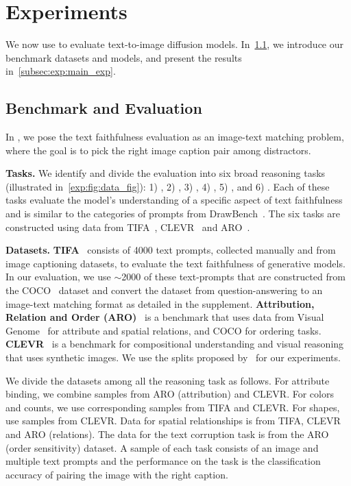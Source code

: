 \section{Experiments}
\label{sec:experiments}

We now use \OURS to evaluate text-to-image diffusion models.
In~\cref{subsec:exp:benchmark}, we introduce our benchmark datasets and models, and present the \OURS results in~\cref{subsec:exp:main_exp}.

\subsection{Benchmark and Evaluation}\label{subsec:exp:benchmark}
In \OURS, we pose the text faithfulness evaluation as an image-text matching problem, where the goal is to pick the right image caption pair among distractors.
\par \noindent \textbf{Tasks.}
We identify and divide the evaluation into six broad reasoning tasks (illustrated in~\cref{exp:fig:data_fig}): 1) ,
 2) , 3) , 4) , 5) , and 6) .
Each of these tasks evaluate the model's understanding of a specific aspect of text faithfulness and is similar to the categories of prompts from DrawBench~\cite{Saharia2022PhotorealisticTD}. 
The six tasks are constructed using data from TIFA~\cite{hu2023tifa}, CLEVR~\cite{Johnson2016CLEVRAD} and ARO~\cite{yuksekgonul2023when}.
\par \noindent \textbf{Datasets.}
\noindent \textbf{TIFA}~\cite{hu2023tifa} consists of 4000 text prompts, collected manually and from image captioning datasets, to evaluate the text faithfulness of generative models.
In our evaluation, we use $\sim$2000 of these text-prompts that are constructed from the COCO~\cite{2014-lin} dataset and convert the dataset from question-answering to an image-text matching format as detailed in the supplement.
\noindent \textbf{Attribution, Relation and Order (ARO)}~\cite{yuksekgonul2023when} is a benchmark that uses data from Visual Genome~\cite{vg} for attribute and spatial relations, and COCO for ordering tasks.
\noindent \textbf{CLEVR}~\cite{Johnson2016CLEVRAD} is a benchmark for compositional understanding and visual reasoning that uses synthetic images.
We use the splits proposed by~\cite{Lewis2022DoesCB} for our experiments.

\noindent
We divide the datasets among all the reasoning task as follows. For attribute binding, we combine samples from ARO (attribution) and CLEVR. For colors and counts, we use corresponding samples from TIFA and CLEVR.
For shapes, use samples from CLEVR.
Data for spatial relationships is from TIFA, CLEVR and ARO (relations).
The data for the text corruption task is from the ARO (order sensitivity) dataset.
A sample of each task consists of an image and multiple text prompts and the performance on the task is the classification accuracy of pairing the image with the right caption.

